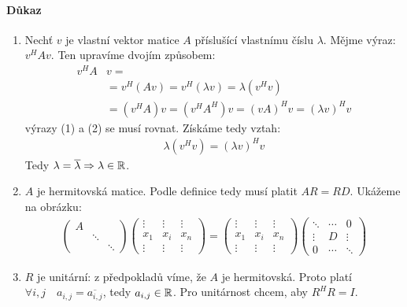 \documentclass[a4paper,10pt]{article}
\begin{document}
\paragraph{Důkaz}
\begin{enumerate}
	\item Nechť $v$ je vlastní vektor matice $A$ příslušící vlastnímu číslu
	$\lambda$. Mějme výraz: $v^H A v$. Ten upravíme dvojím způsobem:
	\begin{align}
		\nonumber v^H A &v =\\
		&= v^H (Av) = v^H (\lambda v) = \lambda (v^H v) \\
		&= (v^H A)v = (v^HA^H) v = (vA)^H v = (\lambda v)^Hv
	\end{align}
	výrazy (1) a (2) se musí rovnat. Získáme tedy vztah:
	\begin{align}
		\lambda(v^H v) = (\lambda v)^Hv
	\end{align}
	Tedy $\lambda = \overline{\lambda} \Rightarrow \lambda \in \mathbb{R}$.
	\item $A$ je hermitovská matice. Podle definice tedy musí platit $AR = RD$.
	Ukážeme na obrázku:
	\begin{align}
	\left(
		\begin{matrix}
		A&& \\
		&\ddots& \\
		&&\ddots
		\end{matrix}
	\right)
	\left(
		\begin{matrix}
			\vdots & \vdots & \vdots \\
			x_1 & x_i & x_n \\
			\vdots & \vdots & \vdots
		\end{matrix}
	\right) 
	= 
	\left(
		\begin{matrix}
			\vdots & \vdots & \vdots \\
			x_1 & x_i & x_n \\
			\vdots & \vdots & \vdots
		\end{matrix}
	\right) 
	\left(
		\begin{matrix}
			\ddots & \cdots & 0 \\
			\vdots & D & \vdots \\
			0 & \cdots & \ddots 
		\end{matrix}
	\right)
	\end{align}
	\item $R$ je unitární: z předpokladů víme, že $A$ je hermitovská. Proto
	platí $\forall i,j \quad a_{i,j} = \overline{ a_{i,j} }$, tedy $a_{i,j} \in
	\mathbb{R}$. Pro unitárnost chcem, aby $R^H R = I$. 
\end{enumerate}
\end{document}
